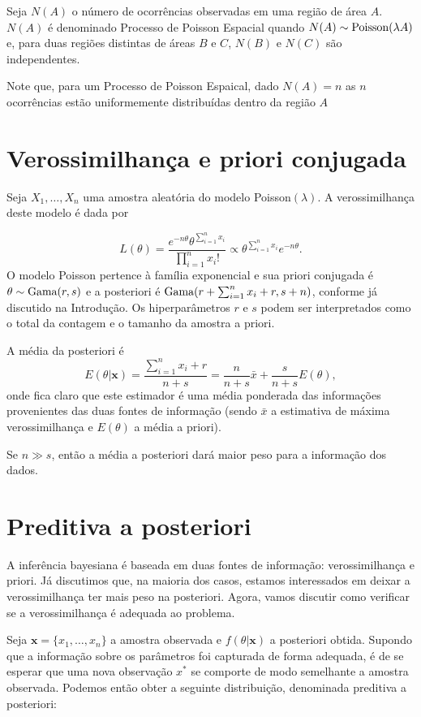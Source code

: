 \documentclass[
  letterpaper,
  DIV=11,
  numbers=noendperiod]{scrreprt}
\theoremstyle{plain}
\theoremstyle{definition}
\theoremstyle{definition}
\theoremstyle{remark}
\begin{document}
Seja \(N(A)\) o número de ocorrências observadas em uma região de área
\(A\). \(N(A)\) é denominado Processo de Poisson Espacial quando
\(N(A)\sim\hbox{Poisson}(\lambda A)\) e, para duas regiões distintas de
áreas \(B\) e \(C\), \(N(B)\) e \(N(C)\) são independentes.

Note que, para um Processo de Poisson Espaical, dado \(N(A)=n\) as \(n\)
ocorrências estão uniformemente distribuídas dentro da região \(A\)

\section{Verossimilhança e priori
conjugada}\label{verossimilhanuxe7a-e-priori-conjugada-1}

Seja \(X_1,\ldots,X_n\) uma amostra aleatória do modelo
Poisson\((\lambda)\). A verossimilhança deste modelo é dada por

\[L(\theta)=\frac{e^{-n\theta}\theta^{\sum_{i=1}^{n}x_i}}{\prod_{i=1}^{n}x_i!}\propto \theta^{\sum_{i=1}^n x_i}e^{-n\theta}.\]
O modelo Poisson pertence à família exponencial e sua priori conjugada é
\(\theta\sim\hbox{Gama}(r,s)\) e a posteriori é
\(\hbox{Gama}(r+\sum_{i=1}^n x_i+r, s+n)\), conforme já discutido na
Introdução. Os hiperparâmetros \(r\) e \(s\) podem ser interpretados
como o total da contagem e o tamanho da amostra a priori.

A média da posteriori é
\[E(\theta|\mathbf{x})=\frac{\sum_{i=1}^{n}x_i+r}{n+s}=\frac{n}{n+s}\bar{x}+\frac{s}{n+s}E(\theta),\]
onde fica claro que este estimador é uma média ponderada das informações
provenientes das duas fontes de informação (sendo \(\bar{x}\) a
estimativa de máxima verossimilhança e \(E(\theta)\) a média a priori).

Se \(n\gg s\), então a média a posteriori dará maior peso para a
informação dos dados.

\section{Preditiva a posteriori}\label{preditiva-a-posteriori-1}

A inferência bayesiana é baseada em duas fontes de informação:
verossimilhança e priori. Já discutimos que, na maioria dos casos,
estamos interessados em deixar a verossimilhança ter mais peso na
posteriori. Agora, vamos discutir como verificar se a verossimilhança é
adequada ao problema.

Seja \(\boldsymbol{x}=\{x_1,\ldots,x_n\}\) a amostra observada e
\(f(\theta|\boldsymbol{x})\) a posteriori obtida. Supondo que a
informação sobre os parâmetros foi capturada de forma adequada, é de se
esperar que uma nova observação \(x^*\) se comporte de modo semelhante a
amostra observada. Podemos então obter a seguinte distribuição,
denominada preditiva a posteriori:
\end{document}
